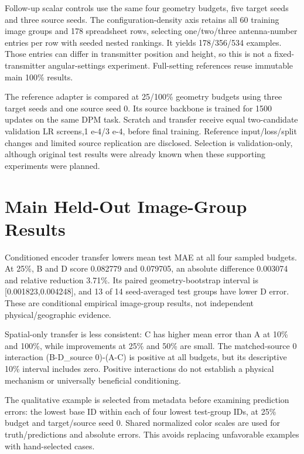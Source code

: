 \documentclass[conference]{IEEEtran}
\begin{document}
Follow-up scalar controls use the same four geometry budgets, five target seeds and three source seeds. The configuration-density axis retains all 60 training image groups and 178 spreadsheet rows, selecting one/two/three antenna-number entries per row with seeded nested rankings. It yields 178/356/534 examples. Those entries can differ in transmitter position and height, so this is not a fixed-transmitter angular-settings experiment. Full-setting references reuse immutable main 100\% results.

The reference adapter is compared at 25/100\% geometry budgets using three target seeds and one source seed 0. Its source backbone is trained for 1500 updates on the same DPM task. Scratch and transfer receive equal two-candidate validation LR screens,1 e-4/3 e-4, before final training. Reference input/loss/split changes and limited source replication are disclosed. Selection is validation-only, although original test results were already known when these supporting experiments were planned.

\section{Main Held-Out Image-Group Results}
Conditioned encoder transfer lowers mean test MAE at all four sampled budgets. At 25\%, B and D score 0.082779 and 0.079705, an absolute difference 0.003074 and relative reduction 3.71\%. Its paired geometry-bootstrap interval is [0.001823,0.004248], and 13 of 14 seed-averaged test groups have lower D error. These are conditional empirical image-group results, not independent physical/geographic evidence.

Spatial-only transfer is less consistent: C has higher mean error than A at 10\% and 100\%, while improvements at 25\% and 50\% are small. The matched-source 0 interaction (B-D\_source 0)-(A-C) is positive at all budgets, but its descriptive 10\% interval includes zero. Positive interactions do not establish a physical mechanism or universally beneficial conditioning.

The qualitative example is selected from metadata before examining prediction errors: the lowest base ID within each of four lowest test-group IDs, at 25\% budget and target/source seed 0. Shared normalized color scales are used for truth/predictions and absolute errors. This avoids replacing unfavorable examples with hand-selected cases.
\end{document}
